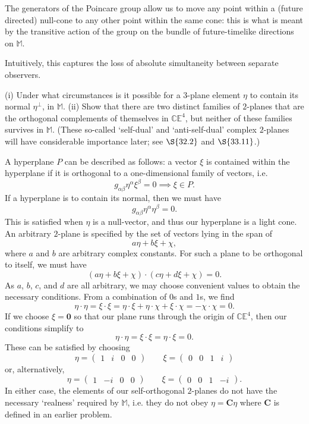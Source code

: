 \documentclass[../road-to-reality.tex]{subfiles}
\begin{document}
\begin{questions}
  \begin{solution}
    The generators of the Poincare group allow us to move any point within a (future directed) null-cone to any other point within the same cone: this is what is meant by the transitive action of the group on the bundle of future-timelike directions on $\mathbb{M}$.

    Intuitively, this captures the loss of absolute simultaneity between separate observers.
  \end{solution}

\question (i) Under what circumstances is it possible for a $3$-plane element $\eta$ to contain its normal $\eta^{\perp}$, in $\mathbb{M}$. (ii) Show that there are two distinct families of $2$-planes that are the orthogonal complements of themselves in $\mathbb{CE}^4$, but neither of these families survives in $\mathbb{M}$. (These so-called `self-dual' and `anti-self-dual' complex $2$-planes will have considerable importance later; see $\S{32.2}$ and $\S{33.11}$.)

  \begin{solution}
    A hyperplane $P$ can be described as follows: a vector $\xi$ is contained within the hyperplane if it is orthogonal to a
    one-dimensional family of vectors, i.e.
    \[
      g_{\alpha\beta}\eta^\alpha\xi^\beta = 0 \implies \xi \in P.
    \]
    If a hyperplane is to contain its normal, then we must have
    \[
      g_{\alpha\beta}\eta^{\alpha}\eta^{\beta} = 0.
    \]
    This is satisfied when $\eta$ is a null-vector, and thus our hyperplane is a light cone.
    An arbitrary $2$-plane is specified by the set of vectors lying in the span of
    \[
      a\eta + b\xi + \chi,
    \] 
    where $a$ and $b$ are arbitrary complex constants. For such a plane to be orthogonal to itself, we must have
    \[
      (a\eta + b\xi + \chi)\cdot(c\eta + d\xi + \chi) = 0.
    \]
    As $a$, $b$, $c$, and $d$ are all arbitrary, we may choose convenient values to obtain the necessary conditions. From a combination of $0$s and $1$s, we find
    \[
      \eta\cdot\eta = \xi\cdot\xi = \eta\cdot\xi + \eta\cdot\chi + \xi\cdot\chi = -\chi\cdot\chi = 0.
    \]
    If we choose $\xi = \mathbf{0}$ so that our plane runs through the origin of $\mathbb{CE}^4$, then our conditions simplify to
    \[
      \eta\cdot\eta = \xi\cdot\xi = \eta\cdot\xi = 0.
    \]
    These can be satisfied by choosing
    \[
      \eta = \begin{pmatrix}1 & i & 0 & 0\end{pmatrix} \qquad \xi = \begin{pmatrix}0 & 0 & 1 & i\end{pmatrix}
    \]
    or, alternatively,
    \[
      \eta = \begin{pmatrix}1 & -i & 0 & 0\end{pmatrix} \qquad \xi = \begin{pmatrix}0 & 0 & 1 & -i\end{pmatrix}.
    \]
    In either case, the elements of our self-orthogonal $2$-planes do not have the necessary `realness' required by $\mathbb{M}$, i.e. they do not obey $\eta = \mathbf{C}\eta$ where $\mathbf{C}$ is defined in an earlier problem.
  \end{solution}


\end{questions}
\end{document}
